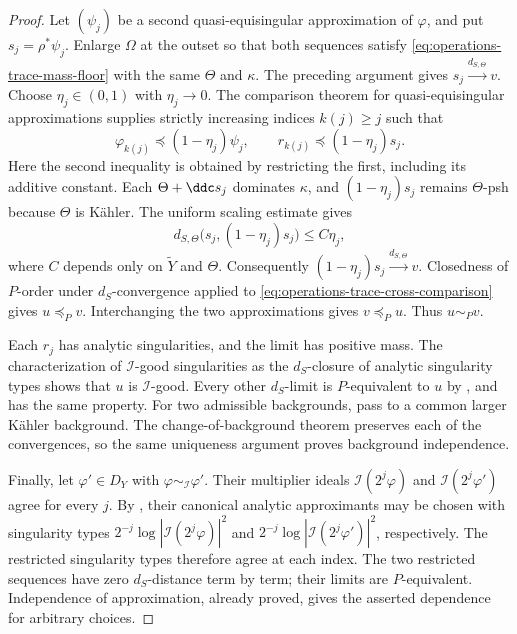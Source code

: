 \begin{proof}
Let $(\psi_j)$ be a second quasi-equisingular approximation of
$\varphi$, and put $s_j=\rho^*\psi_j$.
Enlarge $\Omega$ at the outset so that both sequences satisfy
\eqref{eq:operations-trace-mass-floor} with the same $\Theta$ and
$\kappa$.  The preceding argument gives
$s_j\xrightarrow{d_{S,\Theta}}v$.
Choose $\eta_j\in(0,1)$ with $\eta_j\to0$.
The comparison theorem for quasi-equisingular approximations
\cite[Proposition~1.6.3]{XiaBook} supplies strictly increasing
indices $k(j)\geq j$ such that
\[
 \varphi_{k(j)}\preceq(1-\eta_j)\psi_j,\qquad
 r_{k(j)}\preceq(1-\eta_j)s_j.
\tag{54.22c}\label{eq:operations-trace-cross-comparison}
\]
Here the second inequality is obtained by restricting the first,
including its additive constant.
Each $\Theta+\ddc s_j$ dominates $\kappa$, and
$(1-\eta_j)s_j$ remains $\Theta$-psh because $\Theta$ is K\"ahler.
The uniform scaling estimate
\cite[Lemma~6.2.3]{XiaBook} gives
\[
 d_{S,\Theta}\bigl(s_j,(1-\eta_j)s_j\bigr)\leq C\eta_j,
\tag{54.22d}\label{eq:operations-trace-scaling-estimate}
\]
where $C$ depends only on $\widetilde Y$ and $\Theta$.
Consequently $(1-\eta_j)s_j\xrightarrow{d_{S,\Theta}}v$.
Closedness of $P$-order under $d_S$-convergence
\cite[Proposition~6.2.5]{XiaBook} applied to
\eqref{eq:operations-trace-cross-comparison} gives $u\preceq_P v$.
Interchanging the two approximations gives $v\preceq_P u$.
Thus $u\sim_P v$.

Each $r_j$ has analytic singularities, and the limit has positive
mass.  The characterization of $\mathcal I$-good singularities as
the $d_S$-closure of analytic singularity types
\cite[Theorem~7.1.1]{XiaBook} shows that $u$ is $\mathcal I$-good.
Every other $d_S$-limit is $P$-equivalent to $u$ by
\cite[Proposition~6.2.2]{XiaBook}, and has the same property.
For two admissible backgrounds, pass to a common larger K\"ahler
background.  The change-of-background theorem
\cite[Corollary~6.2.9]{XiaBook} preserves each of the convergences,
so the same uniqueness argument proves background independence.

Finally, let $\varphi'\in D_Y$ with $\varphi\sim_{\mathcal I}\varphi'$.
Their multiplier ideals $\mathcal I(2^j\varphi)$ and
$\mathcal I(2^j\varphi')$ agree for every $j$.
By \cite[Theorem~1.6.2]{XiaBook}, their canonical analytic
approximants may be chosen with singularity types
$2^{-j}\log|\mathcal I(2^j\varphi)|^2$ and
$2^{-j}\log|\mathcal I(2^j\varphi')|^2$, respectively.
The restricted singularity types therefore agree at each index.
The two restricted sequences have zero $d_S$-distance term by term;
their limits are $P$-equivalent.  Independence of approximation,
already proved, gives the asserted dependence for arbitrary choices.
\end{proof}

